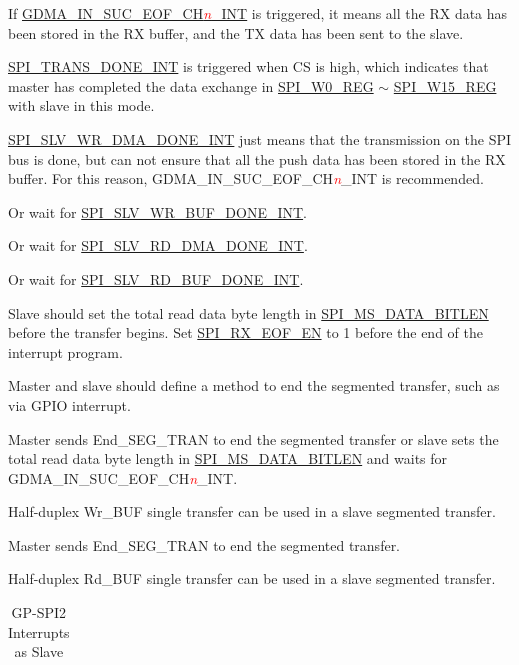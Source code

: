 \documentclass[main\_\_EN.tex]{subfiles}
\begin{document}
\begin{ThreePartTable}

\begin{TableNotes}
    \item[1] If \hyperref[int:GDMAINSUCEOFINT]{GDMA\_IN\_SUC\_EOF\_CH\textcolor{red}{\it{n}}\_INT} is triggered, it means all the RX data has been stored in the RX buffer, and the TX data has been sent to the slave.
    \item[2] \hyperref[int:SPITRANSDONEINT]{SPI\_TRANS\_DONE\_INT} is triggered when CS is high, which indicates that master has completed the data exchange in \hyperref[regdesc:SPIW0REG]{SPI\_W0\_REG} $\sim$ \hyperref[regdesc:SPIW0REG]{SPI\_W15\_REG} with slave in this mode.
    \item[3] \hyperref[int:SPISLVWRDMADONEINT]{SPI\_SLV\_WR\_DMA\_DONE\_INT} just means that the transmission on the SPI bus is done, but can not ensure that all the push data has been stored in the RX buffer. For this reason, GDMA\_IN\_SUC\_EOF\_CH\textcolor{red}{\it{n}}\_INT is recommended.
    \item[4] Or wait for \hyperref[int:SPISLVWRBUFDONEINT]{SPI\_SLV\_WR\_BUF\_DONE\_INT}.
    \item[5] Or wait for \hyperref[int:SPISLVRDDMADONEINT]{SPI\_SLV\_RD\_DMA\_DONE\_INT}.
    \item[6] Or wait for \hyperref[int:SPISLVRDBUFDONEINT]{SPI\_SLV\_RD\_BUF\_DONE\_INT}.
    \item[7] Slave should set the total read data byte length in \hyperref[fielddesc:SPIMSDATABITLEN]{SPI\_MS\_DATA\_BITLEN} before the transfer begins. Set \hyperref[fielddesc:SPIRXEOFEN]{SPI\_RX\_EOF\_EN} to 1 before the end of the interrupt program.
    \item[8] Master and slave should define a method to end the segmented transfer, such as via GPIO interrupt.
    \item[9] Master sends End\_SEG\_TRAN to end the segmented transfer or slave sets the total read data byte length in \hyperref[fielddesc:SPIMSDATABITLEN]{SPI\_MS\_DATA\_BITLEN} and waits for GDMA\_IN\_SUC\_EOF\_CH\textcolor{red}{\it{n}}\_INT.
    \item[10] Half-duplex Wr\_BUF single transfer can be used in a slave segmented transfer.
    \item[11] Master sends End\_SEG\_TRAN to end the segmented transfer.
    \item[12] Half-duplex Rd\_BUF single transfer can be used in a slave segmented transfer.
\end{TableNotes}
\begin{longtable}[c]{|l|l|l|l|}
\caption{GP-SPI2 Interrupts as Slave}\label{tab:spi-slave-interrupt}
\\\hline


\end{longtable}
\end{ThreePartTable}
\end{document}
